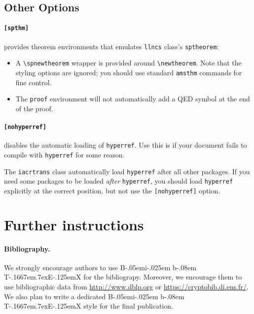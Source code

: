 \documentclass[preprint]{iacrtrans}
\begin{document}
\subsection{Other Options}

\paragraph{\texttt{[spthm]}}
provides theorem environments that emulates
\texttt{llncs} class's \texttt{sptheorem}:
\begin{itemize}
\item A \texttt{\textbackslash spnewtheorem} wrapper is provided
  around \AmS{} \texttt{\textbackslash newtheorem}.  Note that the
  styling options are ignored; you should use standard
  \texttt{amsthm} commands for fine control.
\item The \AmS{} \texttt{proof} environment will not automatically add a
  QED symbol at the end of the proof.
\end{itemize}

\paragraph{\texttt{[nohyperref]}}
disables the automatic loading of
\texttt{hyperref}.  Use this is if your document fails to compile with
\texttt{hyperref} for some reason.

The \texttt{iacrtrans} class automatically load \texttt{hyperref}
after all other packages.  If you need some packages to be loaded
\emph{after} \texttt{hyperref}, you should load \texttt{hyperref}
explicitly at the correct position, but not use the \texttt{[nohyperref]} option.

\section{Further instructions}

\paragraph{Bibliography.}
\def\BibTeX{{\rm B\kern-.05em{\sc i\kern-.025em b}\kern-.08em
    T\kern-.1667em\lower.7ex\hbox{E}\kern-.125emX}}

We strongly encourage authors to use \BibTeX{} for the bibliograpy.
Moreover, we encourage them to use bibliographic data from
\url{http://www.dblp.org} or \url{https://cryptobib.di.ens.fr/}.
We also plan to write a dedicated \BibTeX{} style for the final
publication.
\end{document}
